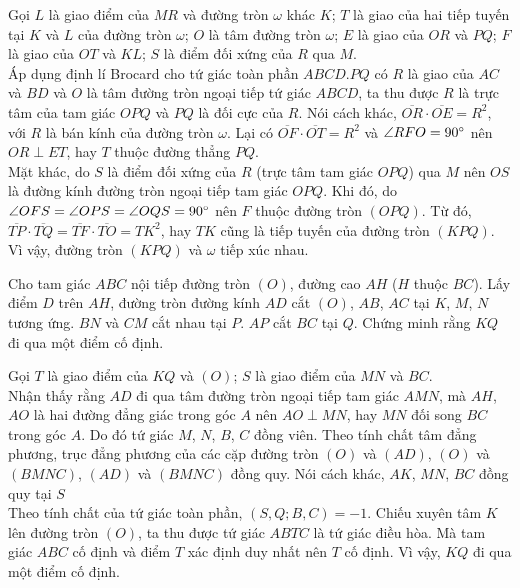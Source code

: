     \begin{solution}
        Gọi \(L\) là giao điểm của \(MR\) và đường tròn \(\omega\) khác \(K\); \(T\) là giao của hai tiếp tuyến tại \(K\) và \(L\) của đường tròn \(\omega\); \(O\) là tâm đường tròn \(\omega\); \(E\) là giao của \(OR\) và \(PQ\); \(F\) là giao của \(OT\) và \(KL\); \(S\) là điểm đối xứng của \(R\) qua \(M\).\\
        Áp dụng định lí Brocard cho tứ giác toàn phần \(ABCD.PQ\) có \(R\) là giao của \(AC\) và \(BD\) và \(O\) là tâm đường tròn ngoại tiếp tứ giác \(ABCD\), ta thu được \(R\) là trực tâm của tam giác \(OPQ\) và \(PQ\) là đối cực của \(R\). Nói cách khác, \(\overline{OR} \cdot \overline{OE} = R^2\), với \(R\) là bán kính của đường tròn \(\omega\). Lại có \(\overline{OF} \cdot \overline{OT} = R^2\) và \(\angle RFO = 90 \degree\) nên \(OR \perp ET\), hay \(T\) thuộc đường thẳng \(PQ\).\\
        Mặt khác, do \(S\) là điểm đối xứng của \(R\) (trực tâm tam giác \(OPQ\)) qua \(M\) nên \(OS\) là đường kính đường tròn ngoại tiếp tam giác \(OPQ\). Khi đó, do \(\angle OFS = \angle OPS = \angle OQS = 90 \degree\) nên \(F\) thuộc đường tròn \((OPQ)\). Từ đó, \(\overline{TP} \cdot \overline{TQ} = \overline{TF} \cdot \overline{TO} = TK^2\), hay \(TK\) cũng là tiếp tuyến của đường tròn \((KPQ)\). Vì vậy, đường tròn \((KPQ)\) và \(\omega\) tiếp xúc nhau.
    \end{solution}

    \begin{problem}
        Cho tam giác \(ABC\) nội tiếp đường tròn \((O)\), đường cao \(AH\) (\(H\) thuộc \(BC\)). Lấy điểm \(D\) trên \(AH\), đường tròn đường kính \(AD\) cắt \((O)\), \(AB\), \(AC\) tại \(K\), \(M\), \(N\) tương ứng. \(BN\) và \(CM\) cắt nhau tại \(P\). \(AP\) cắt \(BC\) tại \(Q\). Chứng minh rằng \(KQ\) đi qua một điểm cố định.
    \end{problem}

    \begin{solution}
        Gọi \(T\) là giao điểm của \(KQ\) và \((O)\); \(S\) là giao điểm của \(MN\) và \(BC\).\\
        Nhận thấy rằng \(AD\) đi qua tâm đường tròn ngoại tiếp tam giác \(AMN\), mà \(AH\), \(AO\) là hai đường đẳng giác trong góc \(A\) nên \(AO \perp MN\), hay \(MN\) đối song \(BC\) trong góc \(A\). Do đó tứ giác \(M\), \(N\), \(B\), \(C\) đồng viên. Theo tính chất tâm đẳng phương, trục đẳng phương của các cặp đường tròn \((O)\) và \((AD)\), \((O)\) và \((BMNC)\), \((AD)\) và \((BMNC)\) đồng quy. Nói cách khác, \(AK\), \(MN\), \(BC\) đồng quy tại \(S\)\\
        Theo tính chất của tứ giác toàn phần, \((S,Q;B,C) = -1\). Chiếu xuyên tâm \(K\) lên đường tròn \((O)\), ta thu được tứ giác \(ABTC\) là tứ giác điều hòa. Mà tam giác \(ABC\) cố định và điểm \(T\) xác định duy nhất nên \(T\) cố định. Vì vậy, \(KQ\) đi qua một điểm cố định.
    \end{solution}

